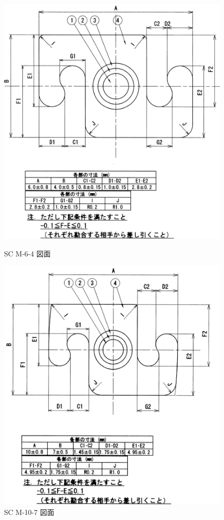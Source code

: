 \documentclass[report]{jlreq}
\begin{document}
\begin{figure}
  \centering
    \begin{minipage}{0.45\columnwidth}
    \centering
    \includegraphics[width=\columnwidth]{SC_M-6-4.jpg}
    \caption{SC M-6-4 図面}
    \label{fig:SC_M-6-4}
  \end{minipage}
  \hspace{5mm}
  \begin{minipage}{0.45\columnwidth}
    \centering 
    \includegraphics[width=\columnwidth]{SC_M-10-7.jpg}
    \caption{SC M-10-7 図面}
    \label{fig:SC_M-10-7}
  \end{minipage}
\end{figure} 
\end{document}
